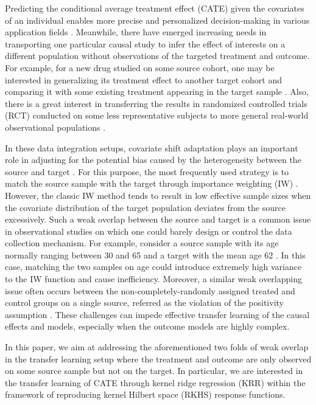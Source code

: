 \documentclass[12pt,a4paper,pdftex,onepage]{article}
\begin{document}
Predicting the conditional average treatment effect (CATE) given the covariates of an individual enables more precise and personalized decision-making in various application fields \citep{kent2018personalized,dube2023personalized}. Meanwhile, there have emerged increasing needs in transporting one particular causal study to infer the effect of interests on a different population without observations of the targeted treatment and outcome. For example, for a new drug studied on some source cohort, one may be interested in generalizing its treatment effect to another target cohort and comparing it with some existing treatment appearing in the target sample \citep{signorovitch2012matching}. Also, there is a great interest in transferring the results in randomized controlled trials (RCT) conducted on some less representative subjects to more general real-world observational populations \citep{colnet2024causal}. 

In these data integration setups, covariate shift adaptation plays an important role in adjusting for the potential bias caused by the heterogeneity between the source and target \citep{pan2009survey}. For this purpose, the most frequently used strategy is to match the source sample with the target through importance weighting (IW) \citep{huang2007correcting,liu2023augmented}. However, the classic IW method tends to result in low effective sample sizes \citep{signorovitch2010comparative} when the covariate distribution of the target population deviates from the source excessively. Such a weak overlap between the source and target is a common issue in observational studies on which one could barely design or control the data collection mechanism.  For example, consider a source sample with its age normally ranging between 30 and 65 and a target with the mean age 62 \citep{ishak2015simulation}. In this case, matching the two samples on age could introduce extremely high variance to the IW function and cause inefficiency. Moreover, a similar weak overlapping issue often occurs between the non-completely-randomly assigned treated and control groups on a single source, referred as the violation of the positivity assumption \citep{cole2008constructing}. These challenges can impede effective transfer learning of the causal effects and models, especially when the outcome models are highly complex.

In this paper, we aim at addressing the aforementioned two folds of weak overlap in the transfer learning setup where the treatment and outcome are only observed on some source sample but not on the target. In particular, we are interested in the transfer learning of CATE through kernel ridge regression (KRR) within the framework of reproducing kernel Hilbert space (RKHS) response functions. 
\end{document}
